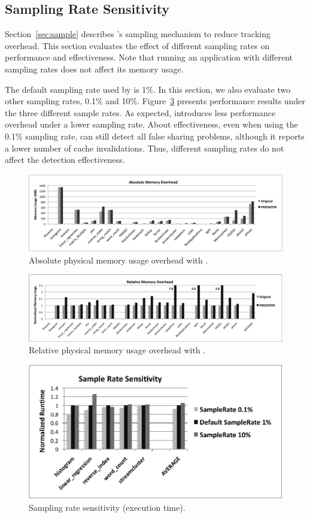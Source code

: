 \subsection{Sampling Rate Sensitivity}
\label{sec:predatorsensitivity}
Section~\ref{sec:sample} describes \Predator{}'s sampling mechanism to reduce tracking overhead. This section evaluates the effect of different sampling rates on performance and effectiveness. Note that running an application with different sampling rates does not affect its memory usage. 

The default sampling rate used by \Predator{} is 1\%. In this section, we also evaluate two other sampling rates, 0.1\% and 10\%. Figure~\ref{fig:predatorsample} presents performance results under the three different sample rates. As expected, \Predator{} introduces less performance overhead under a lower sampling rate. About effectiveness, even when using the 0.1\% sampling rate, \Predator{} can still detect all false sharing problems, although it reports a lower number of cache invalidations. Thus, different sampling rates do not affect the detection effectiveness.
 
\begin{figure}[!t]
\centering
\includegraphics[width=6in]{predator/figure/absolutememory}
\caption{Absolute physical memory usage overhead with \Predator{}.}
\label{fig:absolutememusage}
\end{figure}

\begin{figure}[!t]
\centering
\includegraphics[width=6in]{predator/figure/memusage}
\caption{Relative physical memory usage overhead with \Predator{}.}
\label{fig:memusage}
\end{figure}

\begin{figure}[!t]
\centering
\includegraphics[width=6in]{predator/figure/sample}
\caption{Sampling rate sensitivity (execution time).}
\label{fig:predatorsample}
\end{figure}


